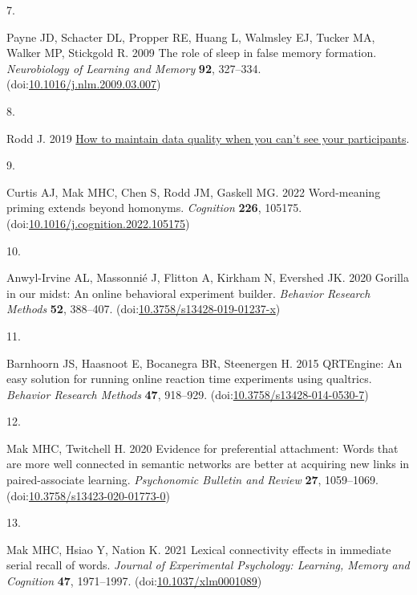 \documentclass[
]{article}
\newlength{\cslhangindent}
\newlength{\csllabelwidth}
\newlength{\cslentryspacingunit} %
\newenvironment{CSLReferences}[2] %
 {%
  \setlength{\parindent}{0pt}
  \ifodd #1
  \let\oldpar\par
  \def\par{\hangindent=\cslhangindent\oldpar}
  \fi
  \setlength{\parskip}{#2\cslentryspacingunit}
 }%
 {}
\newcommand{\CSLLeftMargin}[1]{\parbox[t]{\csllabelwidth}{#1}}
\newcommand{\CSLRightInline}[1]{\parbox[t]{\linewidth - \csllabelwidth}{#1}\break}
\begin{document}
\begin{CSLReferences}{0}{0}
\leavevmode{}%
\CSLLeftMargin{7. }%
\CSLRightInline{Payne JD, Schacter DL, Propper RE, Huang L, Walmsley EJ, Tucker MA, Walker MP, Stickgold R. 2009 The role of sleep in false memory formation. \emph{Neurobiology of Learning and Memory} \textbf{92}, 327--334. (doi:\href{https://doi.org/10.1016/j.nlm.2009.03.007}{10.1016/j.nlm.2009.03.007})}

\leavevmode{}%
\CSLLeftMargin{8. }%
\CSLRightInline{Rodd J. 2019 \href{https://www.psychologicalscience.org/observer/how-to-maintain-data-quality-when-you-cant-see-your-participants}{How to maintain data quality when you can't see your participants}. }

\leavevmode{}%
\CSLLeftMargin{9. }%
\CSLRightInline{Curtis AJ, Mak MHC, Chen S, Rodd JM, Gaskell MG. 2022 Word-meaning priming extends beyond homonyms. \emph{Cognition} \textbf{226}, 105175. (doi:\href{https://doi.org/10.1016/j.cognition.2022.105175}{10.1016/j.cognition.2022.105175})}

\leavevmode{}%
\CSLLeftMargin{10. }%
\CSLRightInline{Anwyl-Irvine AL, Massonnié J, Flitton A, Kirkham N, Evershed JK. 2020 Gorilla in our midst: An online behavioral experiment builder. \emph{Behavior Research Methods} \textbf{52}, 388--407. (doi:\href{https://doi.org/10.3758/s13428-019-01237-x}{10.3758/s13428-019-01237-x})}

\leavevmode{}%
\CSLLeftMargin{11. }%
\CSLRightInline{Barnhoorn JS, Haasnoot E, Bocanegra BR, Steenergen H. 2015 QRTEngine: An easy solution for running online reaction time experiments using qualtrics. \emph{Behavior Research Methods} \textbf{47}, 918--929. (doi:\href{https://doi.org/10.3758/s13428-014-0530-7}{10.3758/s13428-014-0530-7})}

\leavevmode{}%
\CSLLeftMargin{12. }%
\CSLRightInline{Mak MHC, Twitchell H. 2020 Evidence for preferential attachment: Words that are more well connected in semantic networks are better at acquiring new links in paired-associate learning. \emph{Psychonomic Bulletin and Review} \textbf{27}, 1059--1069. (doi:\href{https://doi.org/10.3758/s13423-020-01773-0}{10.3758/s13423-020-01773-0})}

\leavevmode{}%
\CSLLeftMargin{13. }%
\CSLRightInline{Mak MHC, Hsiao Y, Nation K. 2021 Lexical connectivity effects in immediate serial recall of words. \emph{Journal of Experimental Psychology: Learning, Memory and Cognition} \textbf{47}, 1971--1997. (doi:\href{https://doi.org/10.1037/xlm0001089}{10.1037/xlm0001089})}


\end{CSLReferences}
\end{document}
